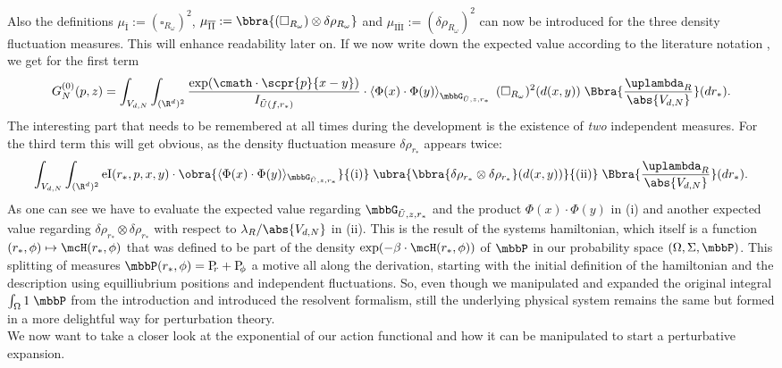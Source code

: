 Also the definitions $\mu_{\overline{\text{I}}}:=(\square_{R_\omega})^2$, $\mu_{\overline{\text{II}}}:=\bbra{(\square_{R_\omega})\otimes\delta\rho_{R_\omega}}$ and $\mu_{\overline{\text{III}}}:=(\delta\rho_{R_\omega})^2$ can now be introduced for the three density fluctuation measures. This will enhance readability later on.
If we now write down the expected value according to the literature notation \cite{mth:vogel,paper:Grigera_2011}, we get for the first term
\[
    G_N^{(0)}(p,z) = \int_{V_{d,N}}\int_{(\R^d)^2}\frac{\exp(\cmath\cdot\scpr{p}{x-y})}{I_{\tilde U(f,r_*)}}\cdot\left\langle
        \Phi(x)\cdot\Phi(y)
    \right\rangle_{\mbbG_{\tilde U,z,r_*}}\;(\square_{R_\omega})^2(d(x,y))\;\Bbra{\frac{\uplambda_R}{\abs{V_{d,N}}}}(dr_*).
\]
The interesting part that needs to be remembered at all times during the development is the existence of \emph{two} independent measures. For the third term this will get obvious, as the density fluctuation measure $\delta\rho_{r_*}$ appears twice:
\[
    \int_{V_{d,N}}\int_{(\R^d)^2}
        \text{eI}(r_*,p,x,y)\cdot \obra{
            \langle
                \Phi(x)\cdot\Phi(y)
            \rangle_{\mbbG_{\tilde U,z,r_*}}
        }{\text{(i)}}
    \;\ubra{\bbra{\delta\rho_{r_*}\otimes\delta\rho_{r_*}}(d(x,y))}{\text{(ii)}}\;\Bbra{\frac{\uplambda_R}{\abs{V_{d,N}}}}(dr_*).
\]
As one can see we have to evaluate the expected value regarding $\mbbG_{\tilde U,z,r_*}$ and the product $\Phi(x)\cdot\Phi(y)$ in (i) and another expected value regarding $\delta\rho_{r_*}\otimes\delta\rho_{r_*}$ with respect to $\lambda_R/\abs{V_{d,N}}$ in (ii). This is the result of the systems hamiltonian, which itself is a function $(r_*,\phi)\mapsto \mcH(r_*,\phi)$ that was defined to be part of the density $\exp(-\beta\cdot\mcH(r_*,\phi))$ of $\mbbP$ in our probability space $(\Omega,\Sigma,\mbbP)$. This splitting of measures $\mbbP(r_*,\phi) = \Pr + \Pf$ a motive all along the derivation, starting with the initial definition of the hamiltonian and the description using equilliubrium positions and independent fluctuations. So, even though we manipulated and expanded the original integral $\int_\Omega 1\;\mbbP$ from the introduction and introduced the resolvent formalism, still the underlying physical system remains the same but formed in a more delightful way for perturbation theory. \\

We now want to take a closer look at the exponential of our action functional and how it can be manipulated to start a perturbative expansion.

